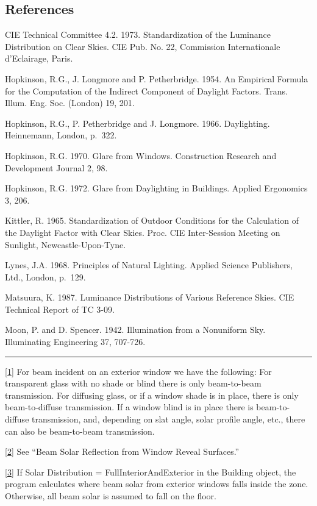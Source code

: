 \subsection{References}\label{references-045}

CIE Technical Committee 4.2. 1973. Standardization of the Luminance Distribution on Clear Skies. CIE Pub. No. 22, Commission Internationale d'Eclairage, Paris.

Hopkinson, R.G., J. Longmore and P. Petherbridge. 1954. An Empirical Formula for the Computation of the Indirect Component of Daylight Factors. Trans. Illum. Eng. Soc. (London) 19, 201.

Hopkinson, R.G., P. Petherbridge and J. Longmore. 1966. Daylighting. Heinnemann, London, p.~322.

Hopkinson, R.G. 1970. Glare from Windows. Construction Research and Development Journal 2, 98.

Hopkinson, R.G. 1972. Glare from Daylighting in Buildings. Applied Ergonomics 3, 206.

Kittler, R. 1965. Standardization of Outdoor Conditions for the Calculation of the Daylight Factor with Clear Skies. Proc. CIE Inter-Session Meeting on Sunlight, Newcastle-Upon-Tyne.

Lynes, J.A. 1968. Principles of Natural Lighting. Applied Science Publishers, Ltd., London, p.~129.

Matsuura, K. 1987. Luminance Distributions of Various Reference Skies. CIE Technical Report of TC 3-09.

Moon, P. and D. Spencer. 1942. Illumination from a Nonuniform Sky. Illuminating Engineering 37, 707-726.

\begin{center}\rule{0.5\linewidth}{\linethickness}\end{center}

\protect\hyperlink{ux5fftnref1}{{[}1{]}} For beam incident on an exterior window we have the following: For transparent glass with no shade or blind there is only beam-to-beam transmission. For diffusing glass, or if a window shade is in place, there is only beam-to-diffuse transmission. If a window blind is in place there is beam-to-diffuse transmission, and, depending on slat angle, solar profile angle, etc., there can also be beam-to-beam transmission.

\protect\hyperlink{ux5fftnref2}{{[}2{]}} See ``Beam Solar Reflection from Window Reveal Surfaces.''

\protect\hyperlink{ux5fftnref3}{{[}3{]}} If Solar Distribution = FullInteriorAndExterior in the Building object, the program calculates where beam solar from exterior windows falls inside the zone. Otherwise, all beam solar is assumed to fall on the floor.

